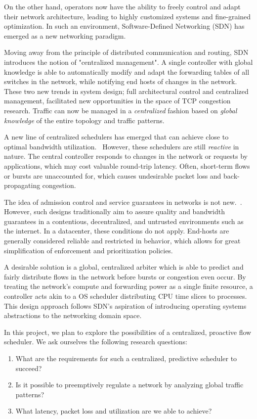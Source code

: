 \documentclass[sigconf]{acmart}
\begin{document}
On the other hand, operators now have the ability to freely control and adapt their network architecture, leading to highly customized systems and fine-grained optimization. In such an environment, Software-Defined Networking (SDN) has emerged as a new networking paradigm.~\cite{sdn_road}

Moving away from the principle of distributed communication and routing, SDN introduces the notion of "centralized management". A single controller with global knowledge is able to automatically modify and adapt the forwarding tables of all switches in the network, while notifying end hosts of changes in the network.
These two new trends in system design; full architectural control and centralized management, facilitated new opportunities in the space of TCP congestion research. Traffic can now be managed in a  \textit{centralized} fashion based on \textit{global knowledge} of the entire topology and traffic patterns.

A new line of centralized schedulers has emerged that can achieve close to optimal bandwidth utilization.~\cite{hedera, fastpass, microte, b4, dionysus}
However, these schedulers are still  \textit{reactive}  in nature. The central controller responds to changes in the network or requests by applications, which may cost valuable round-trip latency. Often, short-term flows or bursts are unaccounted for, which causes undesirable packet loss and back-propagating congestion.

The idea of admission control and service guarantees in networks is not new.~\cite{access_limit, access_limit2}. However, such designs traditionally aim to assure quality and bandwidth guarantees in a contentious, decentralized, and untrusted environments such as the internet. In a datacenter, these conditions do not apply. End-hosts are generally considered reliable and restricted in behavior, which allows for great simplification of enforcement and prioritization policies.

A desirable solution is a global, centralized arbiter which is able to predict and fairly distribute flows in the network before bursts or congestion even occur. By treating the network's compute and forwarding power as a single finite resource, a controller acts akin to a OS scheduler distributing CPU time slices to processes. This design approach follows SDN's aspiration of introducing operating systems abstractions to the networking domain space.

In this project, we plan to explore the possibilities of a centralized, proactive flow scheduler. We ask ourselves the following research questions:
\begin{enumerate}
    \item What are the requirements for such a centralized, predictive scheduler to succeed?
    \item Is it possible to preemptively regulate a network by analyzing global traffic patterns?
    \item What latency, packet loss and utilization are we able to achieve?
\end{enumerate}
\end{document}
